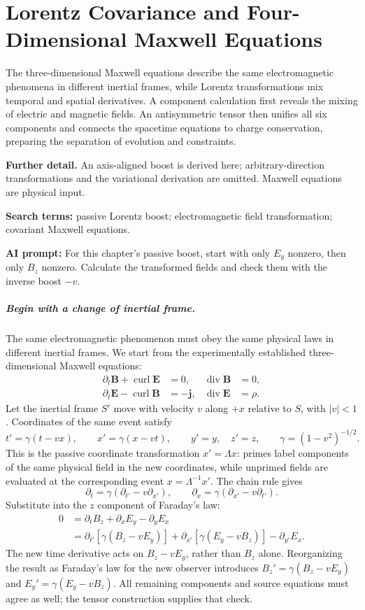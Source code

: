 \documentclass[11pt,openany]{book}
\numberwithin{equation}{chapter}
\theoremstyle{definition}
\theoremstyle{remark}
\newcommand{\Div}{\operatorname{div}}
\newcommand{\curl}{\operatorname{curl}}
\newcommand{\studyroute}[3]{%
  \par\smallskip\noindent\textbf{Further detail.} #1\par
  \begingroup\raggedright\noindent\textbf{Search terms:} #2.\par\endgroup
  \noindent\textbf{AI prompt:} #3\par
}
\begin{document}
\chapter{Lorentz Covariance and Four-Dimensional Maxwell Equations}
\label{ch:lorentz}
\begin{chaptersummary}
The three-dimensional Maxwell equations describe the same electromagnetic phenomena in different inertial frames, while Lorentz transformations mix temporal and spatial derivatives. A component calculation first reveals the mixing of electric and magnetic fields. An antisymmetric tensor then unifies all six components and connects the spacetime equations to charge conservation, preparing the separation of evolution and constraints.
\end{chaptersummary}
\studyroute{An axis-aligned boost is derived here; arbitrary-direction transformations and the variational derivation are omitted. Maxwell equations are physical input.}{passive Lorentz boost; electromagnetic field transformation; covariant Maxwell equations}{For this chapter's passive boost, start with only $E_y$ nonzero, then only $B_z$ nonzero. Calculate the transformed fields and check them with the inverse boost $-v$.}

\paragraph{Begin with a change of inertial frame.}
The same electromagnetic phenomenon must obey the same physical laws in different inertial frames. We start from the experimentally established three-dimensional Maxwell equations:
\begin{equation}\label{eq:maxwell3}
\begin{aligned}
\partial_t\bm B+\curl\bm E&=0,&\Div\bm B&=0,\\
\partial_t\bm E-\curl\bm B&=-\bm j,&\Div\bm E&=\rho.
\end{aligned}
\end{equation}
Let the inertial frame $S'$ move with velocity $v$ along $+x$ relative to $S$, with $|v|<1$.
Coordinates of the same event satisfy
\[
t'=\gamma(t-vx),\qquad x'=\gamma(x-vt),\qquad
y'=y,\quad z'=z,\qquad \gamma=(1-v^2)^{-1/2}.
\]
This is the passive coordinate transformation $x'=\Lambda x$: primes label components
of the same physical field in the new coordinates, while unprimed fields are evaluated at
the corresponding event $x=\Lambda^{-1}x'$.
The chain rule gives
\[
\partial_t=\gamma(\partial_{t'}-v\partial_{x'}),\qquad
\partial_x=\gamma(\partial_{x'}-v\partial_{t'}).
\]
Substitute into the $z$ component of Faraday's law:
\[
\begin{aligned}
0&=\partial_tB_z+\partial_xE_y-\partial_yE_x\\
 &=\partial_{t'}\!\left[\gamma(B_z-vE_y)\right]
  +\partial_{x'}\!\left[\gamma(E_y-vB_z)\right]-\partial_{y'}E_x.
\end{aligned}
\]
The new time derivative acts on $B_z-vE_y$, rather than $B_z$ alone.
Reorganizing the result as Faraday's law for the new observer introduces
$B_z'=\gamma(B_z-vE_y)$ and $E_y'=\gamma(E_y-vB_z)$.
All remaining components and source equations must agree as well; the tensor construction supplies that check.
\end{document}
